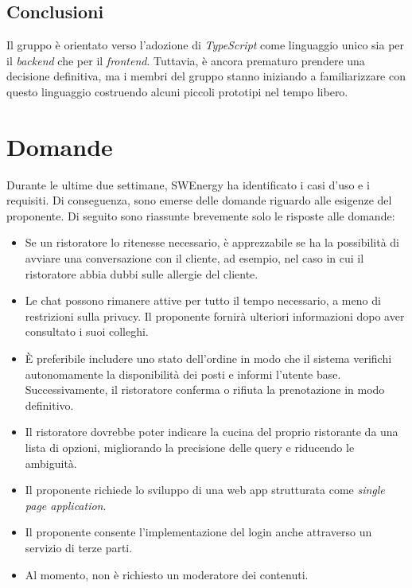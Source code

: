 \subsection{Conclusioni}

Il gruppo è orientato verso l'adozione di \textit{TypeScript} come linguaggio
unico sia per il \textit{backend} che per il \textit{frontend}. Tuttavia, è
ancora prematuro prendere una decisione definitiva, ma i membri del gruppo
stanno iniziando a familiarizzare con questo linguaggio costruendo alcuni
piccoli prototipi nel tempo libero.

\section{Domande}

Durante le ultime due settimane, SWEnergy ha identificato i casi d'uso e i
requisiti. Di conseguenza, sono emerse delle domande riguardo alle esigenze
del proponente. Di seguito sono riassunte brevemente solo le risposte alle
domande:

\begin{itemize}
	\item Se un ristoratore lo ritenesse necessario, è apprezzabile se ha la
	      possibilità di avviare una conversazione con il cliente, ad esempio,
	      nel caso in cui il ristoratore abbia dubbi sulle allergie del cliente.

	\item Le chat possono rimanere attive per tutto il tempo necessario, a meno
	      di restrizioni sulla privacy. Il proponente fornirà ulteriori
	      informazioni dopo aver consultato i suoi colleghi.

	\item È preferibile includere uno stato dell'ordine in modo che il sistema
	      verifichi autonomamente la disponibilità dei posti e informi l'utente
	      base. Successivamente, il ristoratore conferma o rifiuta la
	      prenotazione in modo definitivo.

	\item Il ristoratore dovrebbe poter indicare la cucina del proprio
	      ristorante da una lista di opzioni, migliorando la precisione delle
	      query e riducendo le ambiguità.

	\item Il proponente richiede lo sviluppo di una web app strutturata come
	      \textit{single page application}.

	\item Il proponente consente l'implementazione del login anche attraverso
	      un servizio di terze parti.

	\item Al momento, non è richiesto un moderatore dei contenuti.
\end{itemize}

